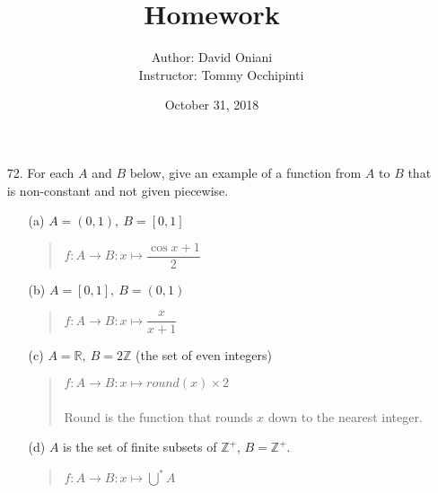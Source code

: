 \documentclass[12pt, a4paper]{article}
\title{\bf{Homework \textnumero 10}}
\author{Author: David Oniani
\\
\ \ \ Instructor: Tommy Occhipinti}
\date{October 31, 2018}
\newcommand{\ints}{\mathbb{Z}}
\newcommand{\reals}{\mathbb{R}}
\newcommand{\pints}{\mathbb{Z}^+}
\begin{document}
\maketitle

\begin{itemize}
\item[72.]
For each $A$ and $B$ below, give an example of a function from $A$ to $B$ that is non-constant and not given piecewise.
\begin{itemize}
\item[(a)]
$A = (0, 1), \ B = [0, 1]$
\begin{quote}
$f : A \rightarrow B : x \mapsto \dfrac{\cos{x} + 1}{2}$
\end{quote}

\item[]

\item[(b)]
$A = [0, 1], \ B = (0, 1)$
\begin{quote}
$f : A \rightarrow B : x \mapsto \dfrac{x}{x + 1}$
\end{quote}

\item[]

\item[(c)]
$A = \reals, \ B = 2 \ints$ (the set of even integers)
\begin{quote}
$f : A \rightarrow B : x \mapsto round(x) \times 2$\\\\
Round is the function that rounds $x$ down to the nearest integer.
\end{quote}

\item[]

\item[(d)]
$A$ is the set of finite subsets of $\pints$, $B = \pints$.
\begin{quote}
$f : A \rightarrow B : x \mapsto \bigcup^*A$
\end{quote}
\end{itemize}

\item[]
\item[]


\end{itemize}
\end{document}
